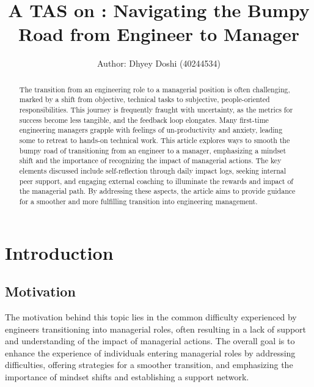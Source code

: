 \documentclass[runningheads]{article}
\begin{document}
%
\title{A TAS on : Navigating the Bumpy Road from Engineer to Manager}
%
%
\author{Author: Dhyey Doshi (40244534)}
%
%

%
\maketitle              %
%
\begin{abstract}
The transition from an engineering role to a managerial position is often challenging, marked by a shift from objective, technical tasks to subjective, people-oriented responsibilities. This journey is frequently fraught with uncertainty, as the metrics for success become less tangible, and the feedback loop elongates. Many first-time engineering managers grapple with feelings of un-productivity and anxiety, leading some to retreat to hands-on technical work. This article explores ways to smooth the bumpy road of transitioning from an engineer to a manager, emphasizing a mindset shift and the importance of recognizing the impact of managerial actions. The key elements discussed include self-reflection through daily impact logs, seeking internal peer support, and engaging external coaching to illuminate the rewards and impact of the managerial path. By addressing these aspects, the article aims to provide guidance for a smoother and more fulfilling transition into engineering management.
\end{abstract}
%
%
%
\section{Introduction}
\subsection{Motivation}
The motivation behind this topic lies in the common difficulty experienced by engineers transitioning into managerial roles, often resulting in a lack of support and understanding of the impact of managerial actions.
The overall goal is to enhance the experience of individuals entering managerial roles by addressing difficulties, offering strategies for a smoother transition, and emphasizing the importance of mindset shifts and establishing a support network.
\end{document}
